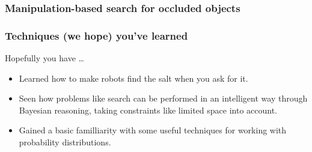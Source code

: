 \begin{frame}
  \frametitle{Manipulation-based search for occluded objects}
\end{frame}

\begin{frame}
  \frametitle{Techniques (we hope) you've learned}
  Hopefully you have \ldots
  \begin{itemize}
    \item Learned how to make robots find the salt when you ask for it.
    \item Seen how problems like search can be performed in an
          intelligent way through Bayesian reasoning,
          taking constraints like limited space into account.
    \item Gained a basic familliarity with some useful techniques for working with probability distributions.
  \end{itemize}
\end{frame}

\begin{frame}
\nocite{*}


\end{frame}
